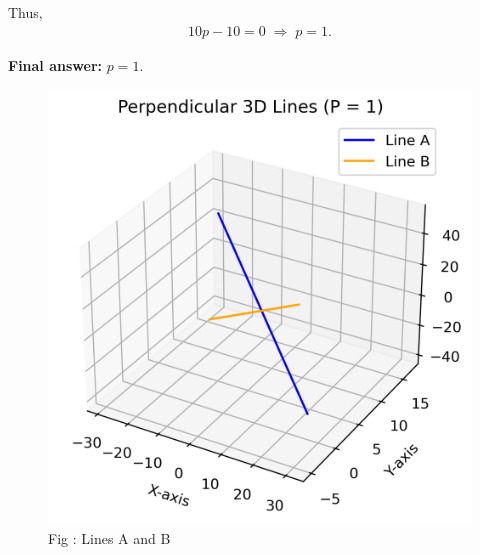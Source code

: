 \documentclass[journal,12pt,onecolumn]{IEEEtran}
\theoremstyle{remark}
\begin{document}
Thus,
\begin{align*}
10p - 10 = 0 \;\Rightarrow\; p=1.
\end{align*}

\textbf{Final answer:} $p=1$.

\pagebreak

\begin{figure}[h!]
  \centering
  \includegraphics[width=0.9\columnwidth]{figs/perpendicular_lines.png} 
   \caption*{Fig : Lines A and B}
  \label{Fig1}
\end{figure}
\end{document}
